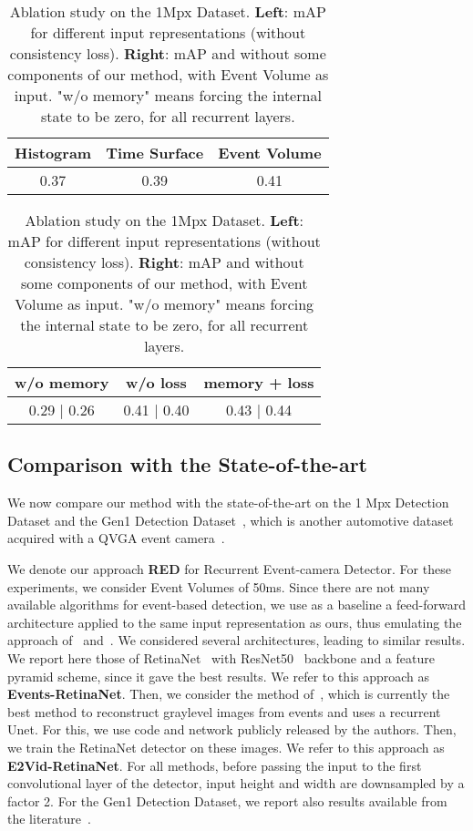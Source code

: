 \documentclass{article}
\begin{document}
\begin{table}[htbp]
    \caption{Ablation study on the 1Mpx  Dataset. \textbf{Left}: mAP for different input representations (without consistency loss). \textbf{Right}: mAP and  without some components of our method, with Event Volume as input. "w/o memory" means forcing the internal state  to be zero, for all recurrent layers.}
    \vspace{1mm}
    \begin{subtable}{.5\linewidth}
      \centering
\tabcolsep=0.11cm
		\begin{tabular}{@{}ccc@{}}
			\toprule
			 Histogram & Time Surface & Event Volume\\             
			\hline
		     0.37  & 0.39   &   0.41\\
			\bottomrule
		\end{tabular}\end{subtable}\begin{subtable}{.5\linewidth}
      \centering
\tabcolsep=0.11cm
		\begin{tabular}{@{}ccc@{}}
			\toprule
			w/o memory & w/o  loss & memory +  loss\\             
			\hline
			0.29 | 0.26 &  0.41 | 0.40   & 0.43 | 0.44     \\    
			\bottomrule
		\end{tabular}\end{subtable} 
    \label{tab:ablation_study}
\end{table}
\subsection{Comparison with the State-of-the-art}
\label{subsec:results}
We now compare our method with the state-of-the-art on the 1 Mpx Detection Dataset and the Gen1 Detection Dataset~\cite{de2020large}, which is another automotive dataset acquired with a QVGA event camera~\cite{posch2010qvga}.

We denote our approach \textbf{RED} for Recurrent Event-camera Detector.
For these experiments, we consider Event Volumes of 50ms. Since there are not many available algorithms for event-based detection,
we use as a baseline a feed-forward architecture applied to the same input representation as ours,
thus emulating the approach of~\cite{miao2019neuromorphic} and~\cite{li2017adaptive}. 
We considered several architectures, leading to similar results. We report here those of RetinaNet~\cite{lin2017focal} with ResNet50~\cite{he2016deep} backbone and a feature pyramid scheme, since it gave the best results. We refer to this approach as \textbf{Events-RetinaNet}.
Then, we consider the method of~\cite{rebecq2019high}, 
which is currently the best method to reconstruct graylevel images from events and uses a recurrent Unet. For this, we use code and network publicly released by the authors. Then, we train the RetinaNet detector on these images.
We refer to this approach as \textbf{E2Vid-RetinaNet}. 
For all methods, before passing the input to the first convolutional layer of the detector, 
input height and width are downsampled by a factor 2.
For the Gen1 Detection Dataset, we report also results available from the literature~\cite{messikommer2020event}.
\end{document}
